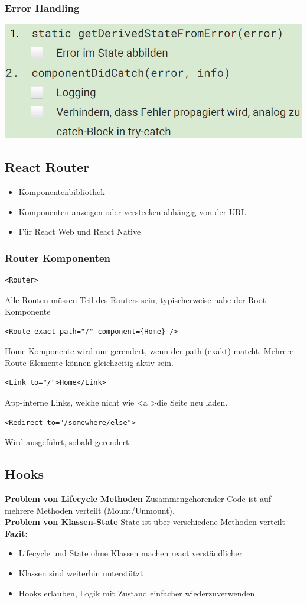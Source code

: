\subsubsection{Error Handling}
\includegraphics[width=0.7\linewidth]{img/react_error_handling.png}

\subsection{React Router}
\begin{itemize}
    \item Komponentenbibliothek
    \item Komponenten anzeigen oder verstecken abhängig von der URL
    \item Für React Web und React Native
\end{itemize}

\subsubsection{Router Komponenten}
\begin{lstlisting}
<Router>
\end{lstlisting}
Alle Routen müssen Teil des Routers sein, typischerweise nahe der Root-Komponente
\begin{lstlisting}
<Route exact path="/" component={Home} />
\end{lstlisting}
Home-Komponente wird nur gerendert, wenn der path (exakt) matcht.
Mehrere Route Elemente können gleichzeitig aktiv sein.
\begin{lstlisting}
<Link to="/">Home</Link>
\end{lstlisting}
App-interne Links, welche nicht wie \textless a \textgreater die Seite neu laden.
\begin{lstlisting}
<Redirect to="/somewhere/else">
\end{lstlisting}
Wird ausgeführt, sobald gerendert.

\subsection{Hooks}
\textbf{Problem von Lifecycle Methoden}
Zusammengehörender Code ist auf mehrere Methoden verteilt (Mount/Unmount).\\
\textbf{Problem von Klassen-State}
State ist über verschiedene Methoden verteilt\\
\textbf{Fazit:}
\begin{itemize}
    \item Lifecycle und State ohne Klassen machen react verständlicher
    \item Klassen sind weiterhin unterstützt
    \item Hooks erlauben, Logik mit Zustand einfacher wiederzuverwenden
\end{itemize}

